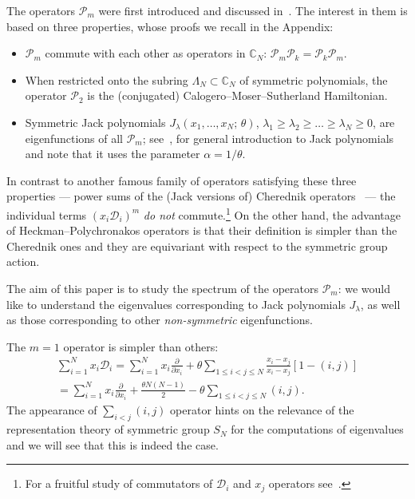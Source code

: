 \documentclass[11pt]{article}
\theoremstyle{definition}
\numberwithin{equation}{section}
\newcommand{\D}{\mathcal D}
\newcommand{\PP}{\mathcal P}
\begin{document}
The operators $\PP_m$ were first introduced and discussed in~\cite{heckman1991elementary,polychronakos1992exchange}. The interest in them is based on three properties, whose proofs we recall in the Appendix:
\begin{itemize}
\item $\PP_m$ commute with each other as operators in $\mathbb C_N$:  $\PP_m \PP_k=\PP_k\PP_m$.
\item When restricted onto the subring $\Lambda_N\subset \mathbb C_N$ of symmetric polynomials, the operator $\PP_2$ is the (conjugated) Calogero--Moser--Sutherland Hamiltonian.
\item Symmetric Jack polynomials $J_\lambda(x_1,\dots,x_N;\, \theta)$, $\lambda_1\ge\lambda_2\ge \dots\ge \lambda_N\ge 0$, are eigenfunctions of all $\PP_m$; see~\cite{stanley1989some}, \cite[Chapter VI]{macdonald1998symmetric} for general introduction to Jack polynomials and note that it uses the parameter $\alpha=1/\theta$.
\end{itemize}


In contrast to another famous family of operators satisfying these three properties --- power sums of the (Jack versions of) Cherednik operators~\cite{cherednik1991unification,cherednik1994integration} --- the individual terms $(x_i \D_i)^m$ \emph{do not} commute.\footnote{For a fruitful study of commutators of $\D_i$ and $x_j$ operators see~\cite{feigin2015dunkl}.} On the other hand, the advantage of Heckman--Polychronakos operators is that their definition is simpler than the Cherednik ones and they are equivariant with respect to the symmetric group action.

The aim of this paper is to study the spectrum of the operators $\PP_m$: we would like to understand the eigenvalues corresponding to Jack polynomials $J_\lambda$, as well as those corresponding to other \emph{non-symmetric} eigenfunctions.

The $m=1$ operator is simpler than others:
\begin{multline*}
 \sum_{i=1}^N x_i \D_i = \sum_{i=1}^N x_i \frac{\partial}{\partial x_i}+\theta \sum_{1\le i<j\le N} \frac{x_i-x_j}{x_i-x_j} [1-(i,j)]\\=
  \sum_{i=1}^N x_i \frac{\partial}{\partial x_i} + \frac{ \theta N(N-1)}{2} - \theta \sum_{1\le i <j\le N} (i,j).
\end{multline*}
The appearance of $\sum_{i<j} (i,j)$ operator hints on the relevance of the representation theory of symmetric group $S_N$ for the computations of eigenvalues and we will see that this is indeed the case.
\end{document}
